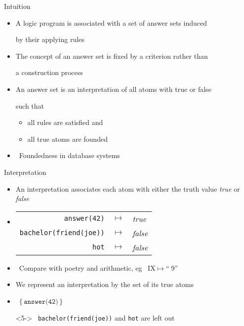 \newcommand{\STROUT}[2]{\alt<#1>{\text{\textcolor{red}{\sout{\ensuremath{\{#2\}}}}}}{\ensuremath{\{#2\}}}}
\begin{frame}[c]{Intuition}
  \begin{itemize}
  \item A logic program is associated with a set of \alert{answer sets} induced
    \par by their applying rules
    \smallskip
  \item The concept of an answer set is fixed by a criterion rather than
    \par a construction process
    \medskip
  \item<2-> An answer set is an interpretation of all atoms with true or false
    \par such that
    \begin{itemize}\normalsize
    \item all rules are satisfied and
    \item all true atoms are founded
    \end{itemize}
    \medskip
  \item<3->  \ Foundedness in database systems
\end{itemize}
\end{frame}
\begin{frame}[c]{Interpretation}
  \begin{itemize}
  \item An \alert{interpretation} associates each atom with either the truth value \textit{true} or \textit{false}
  \item<2-> 
    \par
    \begin{tabular}{rcl}\normalsize
      \lstinline{answer(42)}            & $\mapsto$ & \textit{true}\\
      \lstinline{bachelor(friend(joe))} & $\mapsto$ & \textit{false}\\
      \lstinline{hot}                   & $\mapsto$ & \textit{false}\\
    \end{tabular}
  \item <3>  \ Compare with poetry and arithmetic, eg \ $\textrm{IX}\mapsto \textit{``}\;9\textit{''}$
  \item <4-> We represent an interpretation by the set of its true atoms
    \medskip
  \item <5->  \
    \(
      \{\,\texttt{answer(42)}\,\}
    \)
  \item[]<5->  \ \lstinline{bachelor(friend(joe))} and \lstinline{hot} are left out
  \end{itemize}
\end{frame}
